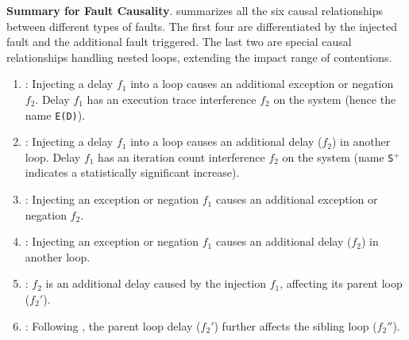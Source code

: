 \textbf{Summary for Fault Causality}. 
 summarizes all the six causal relationships between different types of faults. 
The first four are differentiated 
by the injected fault and the additional fault triggered. 
The last two are special causal relationships handling nested loops, extending the impact range of contentions. 


\begin{enumerate}[leftmargin=3ex, noitemsep, topsep=2pt]
\item {}: Injecting a delay $f_1$ into a loop causes an additional exception or negation $f_2$. Delay $f_1$ has an execution trace interference $f_2$ on the system (hence the name \texttt{E(D)}).

\item {}: Injecting a delay $f_1$ into a loop causes an additional delay ($f_2$) in another loop. Delay $f_1$ has an iteration count interference $f_2$ on the system (name \texttt{S$^{+}$} indicates a statistically significant increase).

\item {}: Injecting an exception or negation $f_1$ causes an additional exception or negation $f_2$. 

\item {}: Injecting an exception or negation $f_1$ causes an additional delay ($f_2$) in another loop.

\item {}: $f_2$ is an additional delay caused by the injection $f_1$, affecting its parent loop ({$f_2'$}).

\item {}: Following , the parent loop delay ($f_2'$) further affects the sibling loop ($f_2''$).
\end{enumerate}



